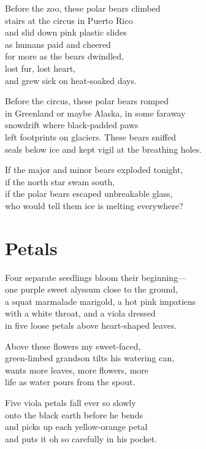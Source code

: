 \documentclass[twoside,10pt]{book}
\begin{document}
Before the zoo, these polar bears climbed\\
stairs at the circus in Puerto Rico\\
and slid down pink plastic slides\\
as humans paid and cheered\\
for more as the bears dwindled,\\
lost fur, lost heart,\\
and grew sick on heat-soaked days.

Before the circus, these polar bears romped\\
in Greenland or maybe Alaska, in some faraway\\
snowdrift where black-padded paws\\
left footprints on glaciers. These bears sniffed\\
seals below ice and kept vigil at the breathing holes.

If the major and minor bears exploded tonight,\\
if the north star swam south,\\
if the polar bears escaped unbreakable glass,\\
who would tell them ice is melting everywhere?


\clearpage
\section{Petals}

Four separate seedlings bloom their beginning---\\
one purple sweet alyssum close to the ground,\\
a squat marmalade marigold, a hot pink impatiens\\
with a white throat, and a viola dressed\\
in five loose petals above heart-shaped leaves.

Above these flowers my sweet-faced,\\
green-limbed grandson tilts his watering can,\\
wants more leaves, more flowers, more\\
life as water pours from the spout.

Five viola petals fall ever so slowly\\
onto the black earth before he bends\\
and picks up each yellow-orange petal\\
and puts it oh so carefully in his pocket.
\end{document}
